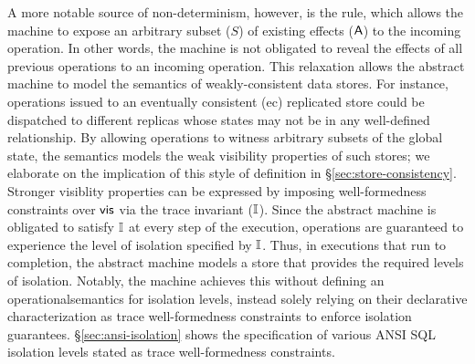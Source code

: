 A more notable source of non-determinism, however, is the
 rule, which allows the machine to expose an
arbitrary subset ($S$) of existing effects ($\textsf{A}$) to the incoming
operation. In other words, the machine is not obligated to reveal the
effects of all previous operations to an incoming operation. This
relaxation allows the abstract machine to model the semantics of
weakly-consistent data stores. For instance, operations issued to an
eventually consistent ({\sc ec}) replicated store could be dispatched
to different replicas whose states may not be in any well-defined
relationship. By allowing operations to witness arbitrary subsets of
the global state, the semantics models the weak visibility properties
of such stores; we elaborate on the implication of this style of
definition in \S\ref{sec:store-consistency}.  Stronger visiblity
properties can be expressed by imposing well-formedness constraints
over $\textsf{vis}$ via the trace invariant ($\mathbb{I}$). Since the abstract
machine is obligated to satisfy $\mathbb{I}$ at every step of the execution,
operations are guaranteed to experience the level of isolation
specified by $\mathbb{I}$.  Thus, in executions that run to completion, the
abstract machine models a store that provides the required levels of
isolation.  Notably, the machine achieves this without defining an
operationalsemantics for isolation levels, instead solely relying on
their declarative characterization as trace well-formedness
constraints to enforce isolation guarantees.
\S\ref{sec:ansi-isolation} shows the specification of various ANSI SQL
isolation levels stated as trace well-formedness constraints.



